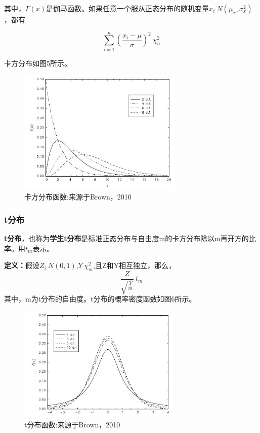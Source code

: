\documentclass[cn,10pt,math=newtx,citestyle=gb7714-2015,bibstyle=gb7714-2015]{elegantbook}
\begin{document}
	其中，$\Gamma(x)$是伽马函数。如果任意一个服从正态分布的随机变量$x_i~N(\mu_x,\sigma_x^2)$，都有
	
	\begin{equation}
		\sum_{i=1}^n{(\frac{x_i-\mu}{\sigma})^2}~\chi_n^2
	\end{equation}
	
	卡方分布如图5所示。
		\begin{figure}[htbp]
		\centering
		\includegraphics[width=0.7\textwidth]{chi.jpg}
		\caption{卡方分布函数:来源于Brown，2010}\label{fig:digit}
	\end{figure}
	

	
	\subsubsection{t分布}
	\textbf{t分布}，也称为\textbf{学生t分布}是标准正态分布与自由度m的卡方分布除以m再开方的比率。用$t_m$表示。
	
	\textbf{定义：}假设$Z_i~N(0,1)$,$Y~\chi_m^2$,且Z和Y相互独立，那么，
	\begin{equation}
		\frac{Z}{\sqrt{\frac{Y}{m}}}~t_m
	\end{equation}
	其中，m为t分布的自由度。t分布的概率密度函数如图6所示。
		\begin{figure}[htbp]
		\centering
		\includegraphics[width=0.7\textwidth]{t.jpg}
		\caption{t分布函数:来源于Brown，2010}\label{fig:digit}
	\end{figure}
	
\end{document}
